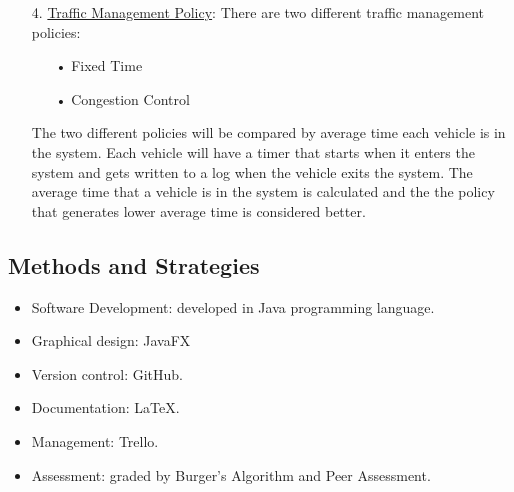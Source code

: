 \documentclass[11pt]{article}
\begin{document}
\begin{description}
\begin{itemize}
		\item[4. ] \underline{Traffic Management Policy}: There are two different traffic management policies:
		\begin{itemize}
		\item[•] Fixed Time
		\item[•] Congestion Control
		\end{itemize}
		
The two different policies will be compared by average time each vehicle is in the system. Each vehicle will have a timer that starts when it enters the system and gets written to a log when the vehicle exits the system. The average time that a vehicle is in the system is calculated and the the policy that generates lower average time is considered better.
		 		
		
	\end{itemize}
\end{description}

\subsection{Methods and Strategies}
\begin{itemize}
\item Software Development: developed in Java programming language.
\item Graphical design: JavaFX
\item Version control: GitHub.
\item Documentation: LaTeX.
\item Management: Trello.
\item Assessment: graded by Burger’s Algorithm and Peer Assessment.
\end{itemize}
\end{document}
